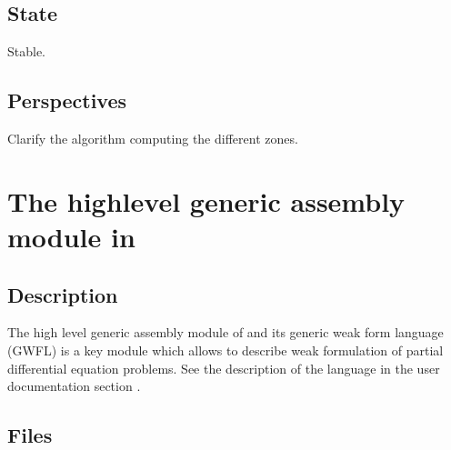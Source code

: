 \documentclass[a4paper,11pt,english]{sphinxmanual}
\begin{document}
\subsection{State}
\label{\detokenize{project/libdesc_levelset:state}}
Stable.


\subsection{Perspectives}
\label{\detokenize{project/libdesc_levelset:perspectives}}
Clarify the algorithm computing the different zones.


\section{The high\sphinxhyphen{}level generic assembly module in }
\label{\detokenize{project/libdesc_high_gen_assemb:the-high-level-generic-assembly-module-in-gf}}\label{\detokenize{project/libdesc_high_gen_assemb:dp-libdesc-high-assemb}}\label{\detokenize{project/libdesc_high_gen_assemb::doc}}

\subsection{Description}
\label{\detokenize{project/libdesc_high_gen_assemb:description}}
The high level generic assembly module of  and its generic weak form language (GWFL) is a key module which allows to describe weak formulation of partial differential equation problems. See the description of the language in the user documentation section .


\subsection{Files}
\label{\detokenize{project/libdesc_high_gen_assemb:files}}
\end{document}
